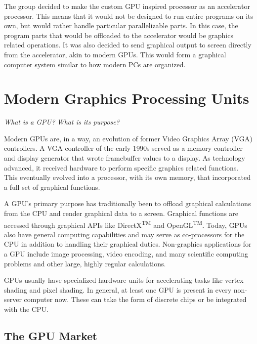 \documentclass[../main/report.tex]{subfiles}
\begin{document}
The group decided to make the custom GPU inspired processor as an accelerator processor.
This means that it would not be designed to run entire programs on its own, but would rather handle particular parallelizable parts.
In this case, the program parts that would be offloaded to the accelerator would be graphics related operations.
It was also decided to send graphical output to screen directly from the accelerator, akin to modern GPUs.
This would form a graphical computer system similar to how modern PCs are organized.

\section{Modern Graphics Processing Units}

\textit{What is a GPU?}
\textit{What is its purpose?}


Modern GPUs are, in a way, an evolution of former Video Graphics Array (VGA) controllers.
A VGA controller of the early 1990s served as a memory controller and display generator that wrote framebuffer values to a display.
As technology advanced, it received hardware to perform specific graphics related functions.
This eventually evolved into a processor, with its own memory, that incorporated a full set of graphical functions.

A GPU's primary purpose has traditionally been to offload graphical calculations from the CPU and render graphical data to a screen.
Graphical functions are accessed through graphical APIs like DirectX\textsuperscript{TM} and OpenGL\textsuperscript{TM}.
Today, GPUs also have general computing capabilities and may serve as co-processors for the CPU in addition to handling their graphical duties.
Non-graphics applications for a GPU include image processing, video encoding, and many scientific computing problems and other large, highly regular calculations.

GPUs usually have specialized hardware units for accelerating tasks like vertex shading and pixel shading.
In general, at least one GPU is present in every non-server computer now.
These can take the form of discrete chips or be integrated with the CPU.

\subsection{The GPU Market}
\end{document}
